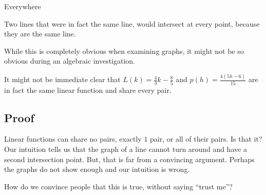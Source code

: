 \documentclass{ximera}
\begin{document}
\begin{example} Everywhere 

Two lines that were in fact the same line, would intersect at every point, because they are the same line.
\begin{image}
\end{image}


While this is completely obvious when examining graphs, it might not be so obvious during an algebraic investigation.

It might not be immediate clear that $L(k) = \frac{4}{3}k - \frac{8}{5}$ and $p(h) = \frac{4(5h-6)}{15}$ are in fact the same linear function and share every pair.

\end{example}










\subsection*{Proof}



Linear functions can share no pairs, exactly $1$ pair, or all of their pairs.  Is that it?  Our intuition tells us that the graph of a line cannot turn around and have a second intersection point.  But, that is far from a convincing argument.  Perhaps the graphs do not show enough and our intuition is wrong.  

How do we convince people that this is true, without saying ``trust me''?
\end{document}
